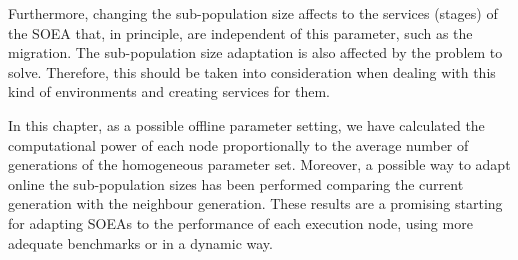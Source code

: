 Furthermore, changing the sub-population size affects to the services (stages)
of the SOEA that, in principle, are independent of this parameter, such as
the migration. The sub-population size adaptation is also affected by the problem to solve. Therefore, this should be taken into consideration when dealing with this kind of environments and creating services for them.

In this chapter, as a possible offline parameter setting, we have calculated the computational power of each node proportionally 
to the average number of generations of the homogeneous parameter set. Moreover, a possible way to adapt 
online the sub-population sizes has been performed comparing the current generation with
 the neighbour generation. These results are a promising starting for adapting SOEAs to the
performance of each execution node, using more adequate benchmarks or in a dynamic way. 


